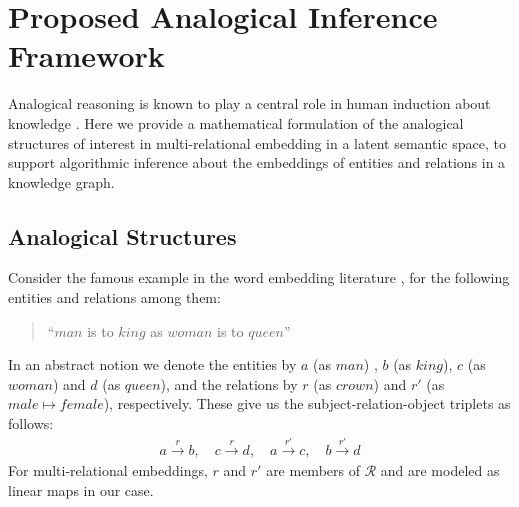 \documentclass{article}
\begin{document}
 \section{Proposed Analogical Inference Framework}
\label{sec:analogies}
Analogical reasoning is known to play a central role in human induction about knowledge \cite{gentner1983structure, minsky1988society, holyoak1996mental, hofstadter2001analogy}. Here we provide a mathematical formulation of the analogical structures of interest in multi-relational embedding in a latent semantic space, to support algorithmic inference about the embeddings of entities and relations in a knowledge graph. 


\subsection{Analogical Structures}
Consider the famous example in the word embedding literature \cite{mikolov2013distributed, pennington2014glove},
for the following entities and relations among them: 
\begin{quote}
``$man$ is to $king$ as $woman$ is to $queen$''
\end{quote}
In an abstract notion we denote the entities by $a$ (as $man$) , $b$ (as $king$), $c$ (as $woman$) and $d$ (as $queen$), and the relations by  $r$ (as $crown$)  and $r'$ (as $male \mapsto female$), respectively. These give us the subject-relation-object triplets as follows:
\begin{align}
    a \stackrel{r}{\rightarrow} b, \quad c \stackrel{r}{\rightarrow} d, \quad
    a \stackrel{r'}{\rightarrow} c, \quad b \stackrel{r'}{\rightarrow} d
    \label{eq:abcd}
\end{align}
For multi-relational embeddings,
$r$ and $r'$ are members of $\mathcal{R}$ and are modeled as linear maps in our case.
\end{document}
